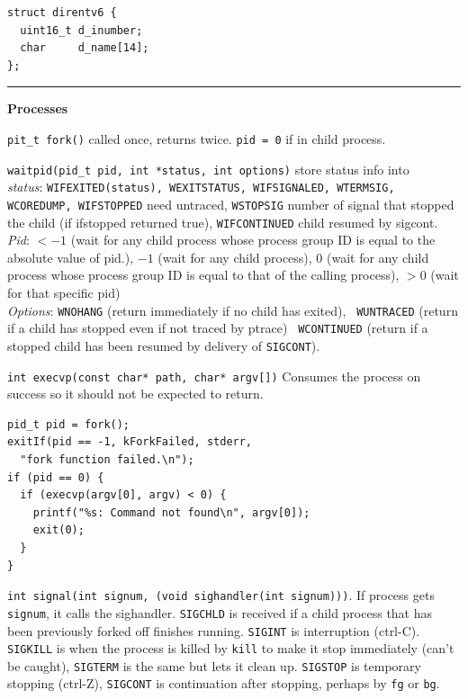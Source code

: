 \documentclass{article}
\begin{document}
\begin{multicols}{2}
\begin{verbatim}
struct direntv6 {
  uint16_t d_inumber;
  char     d_name[14];
};
  \end{verbatim}

  \noindent\rule{4cm}{0.4pt}

  {\bf Processes}

  {\tt pit\_t fork()} called once, returns twice. {\tt pid = 0} if in child
  process.

  {\tt waitpid(pid\_t pid, int *status, int options)} store status info into\\
  {\it status}: {\tt WIFEXITED(status), WEXITSTATUS, WIFSIGNALED, WTERMSIG,
  WCOREDUMP, WIFSTOPPED} need untraced, {\tt WSTOPSIG} number of signal that
  stopped the child (if ifstopped returned true), {\tt WIFCONTINUED} child
  resumed by
  sigcont.\\
  {\it Pid}: $<-1$ (wait for any child process whose process group ID is equal to the
  absolute value of pid.), $-1$ (wait for any child process), $0$ (wait for any
  child process whose process group ID is equal to that of the calling process),
  $>0$ (wait for that specific pid)\\
  {\it Options}: {\tt WNOHANG} (return immediately if no child has exited), {\tt
  WUNTRACED} (return if a child has stopped even if not traced by ptrace) {\tt
  WCONTINUED} (return if a stopped child has been resumed by delivery of
  \texttt{SIGCONT}).

  {\tt int execvp(const char* path, char* argv[])} Consumes the process on
  success so it should not be expected to return.
\begin{verbatim}
pid_t pid = fork();
exitIf(pid == -1, kForkFailed, stderr,
  "fork function failed.\n");
if (pid == 0) {
  if (execvp(argv[0], argv) < 0) {
    printf("%s: Command not found\n", argv[0]);
    exit(0);
  }
}\end{verbatim}

  {\tt int signal(int signum, (void sighandler(int signum)))}. If process gets
  {\tt signum}, it calls the sighandler. \texttt{SIGCHLD} is received if a child
  process that has been previously forked off finishes running. \texttt{SIGINT}
  is interruption (ctrl-C). \texttt{SIGKILL} is when the process is killed by
  \texttt{kill} to make it stop immediately (can't be caught), \texttt{SIGTERM}
  is the same but lets it clean up. \texttt{SIGSTOP} is temporary stopping
  (ctrl-Z), \texttt{SIGCONT} is continuation after stopping, perhaps by
  \texttt{fg} or \texttt{bg}.


\end{multicols}
\end{document}
